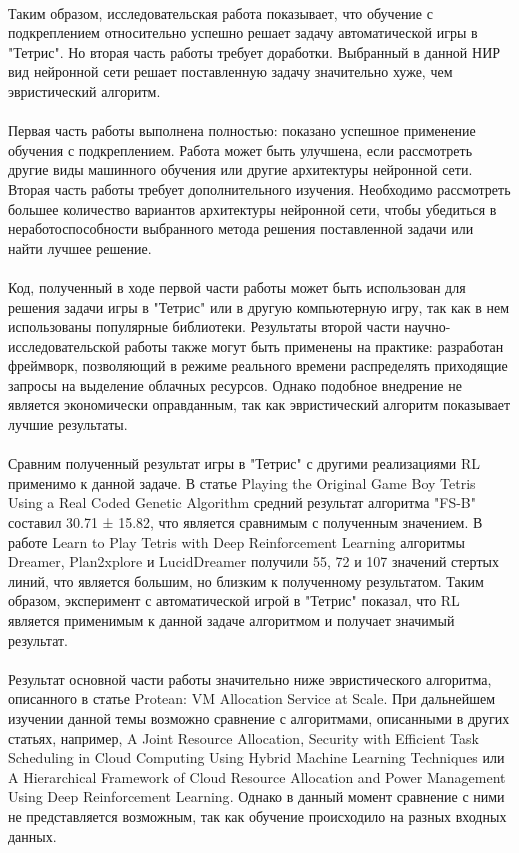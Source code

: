 \documentclass{article}
\begin{document}
~\\
Таким образом, исследовательская работа показывает, что обучение с подкреплением относительно успешно решает задачу автоматической игры в "Тетрис". Но вторая часть работы требует доработки. Выбранный в данной НИР вид нейронной сети решает поставленную задачу значительно хуже, чем эвристический алгоритм.\\
~\\
Первая часть работы выполнена полностью: показано успешное применение обучения с подкреплением. Работа может быть улучшена, если рассмотреть другие виды машинного обучения или другие архитектуры нейронной сети. Вторая часть работы требует дополнительного изучения. Необходимо рассмотреть большее количество вариантов архитектуры нейронной сети, чтобы убедиться в неработоспособности выбранного метода решения поставленной задачи или найти лучшее решение.\\
~\\
Код, полученный в ходе первой части работы может быть использован для решения задачи игры в "Тетрис" или в другую компьютерную игру, так как в нем использованы популярные библиотеки. Результаты второй части научно-исследовательской работы также могут быть применены на практике: разработан фреймворк, позволяющий в режиме реального времени распределять приходящие запросы на выделение облачных ресурсов. Однако подобное внедрение не является экономически оправданным, так как эвристический алгоритм показывает лучшие результаты.\\
~\\
Сравним полученный результат игры в "Тетрис" с другими реализациями RL применимо к данной задаче. В статье Playing the Original Game Boy Tetris Using a Real Coded Genetic Algorithm\cite{litlink7} средний результат алгоритма "FS-B" составил 30.71 ± 15.82, что является сравнимым с полученным значением. В работе Learn to Play Tetris with Deep Reinforcement Learning\cite{litlink20} алгоритмы Dreamer, Plan2xplore и LucidDreamer получили 55, 72 и 107 значений стертых линий, что является большим, но близким к полученному результатом. Таким образом, эксперимент с автоматической игрой в "Тетрис" показал, что RL является применимым к данной задаче алгоритмом и получает значимый результат.\\
~\\
Результат основной части работы значительно ниже эвристического алгоритма, описанного в статье Protean: VM Allocation Service at Scale\cite{litlink21}. При дальнейшем изучении данной темы возможно сравнение с алгоритмами, описанными в других статьях, например, A Joint Resource Allocation, Security with Efficient Task Scheduling in Cloud Computing Using Hybrid Machine Learning Techniques\cite{litlink23} или A Hierarchical Framework of Cloud Resource Allocation and Power Management Using Deep Reinforcement Learning\cite{litlink24}. Однако в данный момент сравнение с ними не представляется возможным, так как обучение происходило на разных входных данных.
\end{document}
